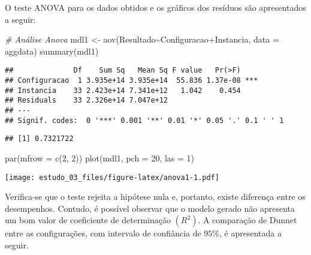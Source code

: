 \documentclass[
]{article}
\newenvironment{Shaded}{\begin{snugshade}}{\end{snugshade}}
\newcommand{\AttributeTok}[1]{\textcolor[rgb]{0.77,0.63,0.00}{#1}}
\newcommand{\CommentTok}[1]{\textcolor[rgb]{0.56,0.35,0.01}{\textit{#1}}}
\newcommand{\DecValTok}[1]{\textcolor[rgb]{0.00,0.00,0.81}{#1}}
\newcommand{\FunctionTok}[1]{\textcolor[rgb]{0.00,0.00,0.00}{#1}}
\newcommand{\NormalTok}[1]{#1}
\newcommand{\OtherTok}[1]{\textcolor[rgb]{0.56,0.35,0.01}{#1}}
\newcommand{\SpecialCharTok}[1]{\textcolor[rgb]{0.00,0.00,0.00}{#1}}
\begin{document}
O teste ANOVA para os dados obtidos e os gráficos dos resíduos são
apresentados a seguir:

\begin{Shaded}
\begin{Highlighting}[]
\CommentTok{\# Análise Anova }
\NormalTok{mdl1 }\OtherTok{\textless{}{-}} \FunctionTok{aov}\NormalTok{(Resultado}\SpecialCharTok{\textasciitilde{}}\NormalTok{Configuracao}\SpecialCharTok{+}\NormalTok{Instancia, }\AttributeTok{data =}\NormalTok{ aggdata)}
\FunctionTok{summary}\NormalTok{(mdl1)}
\end{Highlighting}
\end{Shaded}

\begin{verbatim}
##              Df    Sum Sq   Mean Sq F value   Pr(>F)    
## Configuracao  1 3.935e+14 3.935e+14  55.836 1.37e-08 ***
## Instancia    33 2.423e+14 7.341e+12   1.042    0.454    
## Residuals    33 2.326e+14 7.047e+12                     
## ---
## Signif. codes:  0 '***' 0.001 '**' 0.01 '*' 0.05 '.' 0.1 ' ' 1
\end{verbatim}

\begin{Shaded}
\end{Shaded}

\begin{verbatim}
## [1] 0.7321722
\end{verbatim}

\begin{Shaded}
\begin{Highlighting}[]
\FunctionTok{par}\NormalTok{(}\AttributeTok{mfrow =} \FunctionTok{c}\NormalTok{(}\DecValTok{2}\NormalTok{, }\DecValTok{2}\NormalTok{))}
\FunctionTok{plot}\NormalTok{(mdl1, }\AttributeTok{pch =} \DecValTok{20}\NormalTok{, }\AttributeTok{las =} \DecValTok{1}\NormalTok{)}
\end{Highlighting}
\end{Shaded}

\texttt{[image: estudo\_03\_files/figure-latex/anova1-1.pdf]}

Verifica-se que o teste rejeita a hipótese nula e, portanto, existe
diferença entre os desempenhos. Contudo, é possível observar que o
modelo gerado não apresenta um bom valor de coeficiente de determinação
\((R^2)\). A comparação de Dunnet entre as configurações, com intervalo
de confiância de \(95\%\), é apresentada a seguir.
\end{document}
